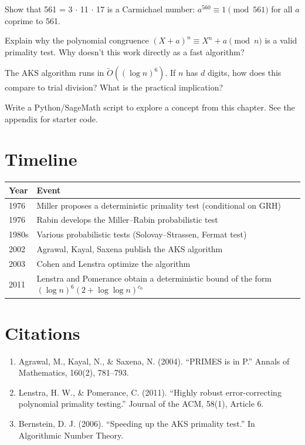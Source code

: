 \begin{exercise}[Intermediate]
Show that 561 = 3 $\cdot$ 11 $\cdot$ 17 is a Carmichael number: $a^{560} \equiv 1 \pmod{561}$ for all $a$ coprime to 561.
\end{exercise}

\begin{exercise}[Challenge]
Explain why the polynomial congruence $(X+a)^n \equiv X^n + a \pmod{n}$ is a valid primality test. Why doesn't this work directly as a fast algorithm?
\end{exercise}

\begin{exercise}
The AKS algorithm runs in $\tilde{O}((\log n)^6)$. If $n$ has $d$ digits, how does this compare to trial division? What is the practical implication?
\end{exercise}


\begin{exercise}[Computational]
Write a Python/SageMath script to explore a concept from this chapter. See the appendix for starter code.
\end{exercise}

\section{Timeline}

\begin{tabularx}{\linewidth}{lX}
\toprule
\textbf{Year} & \textbf{Event} \\ \midrule
1976 & Miller proposes a deterministic primality test (conditional on GRH) \\ 
1976 & Rabin develops the Miller--Rabin probabilistic test \\ 
1980s & Various probabilistic tests (Solovay--Strassen, Fermat test) \\ 
2002 & Agrawal, Kayal, Saxena publish the AKS algorithm \cite{agrawal2004} \\ 
2003 & Cohen and Lenstra optimize the algorithm \cite{bernstein2006} \\ 
2011 & Lenstra and Pomerance obtain a deterministic bound of the form $(\log n)^6(2+\log\log n)^{c_0}$ \cite{lenstra2011} \\ \bottomrule
\end{tabularx}

\section{Citations}

\begin{enumerate}
\item Agrawal, M., Kayal, N., \& Saxena, N. (2004). ``PRIMES is in P.'' Annals of Mathematics, 160(2), 781--793.
\item Lenstra, H. W., \& Pomerance, C. (2011). ``Highly robust error-correcting polynomial primality testing.'' Journal of the ACM, 58(1), Article 6.
\item Bernstein, D. J. (2006). ``Speeding up the AKS primality test.'' In Algorithmic Number Theory.
\end{enumerate}
